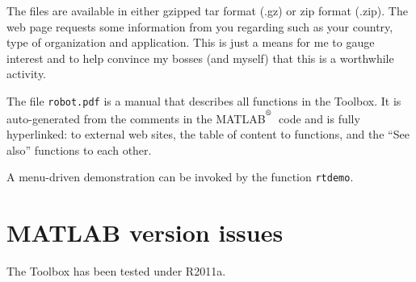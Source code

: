 \documentclass[a4paper]{report}
\def\Mlab{MATLAB$^{\textsuperscript{\textregistered}}$}
\begin{document}
The files are available in either gzipped tar format (.gz) or zip
format (.zip).  The web page requests some information from you
regarding such as your country, type of organization and application.
This is just a means for me to gauge interest and to help convince my
bosses (and myself) that this is a worthwhile activity.

The file {\tt robot.pdf} is a manual that describes all functions in the Toolbox.
It is auto-generated from the comments in the \Mlab\ code and is fully hyperlinked:
to external web sites, the table of content to functions, and the ``See also'' functions
to each other.

A menu-driven demonstration can be invoked by the function {\tt rtdemo}.

\section{MATLAB version issues}
The Toolbox has been tested under R2011a.
\end{document}
